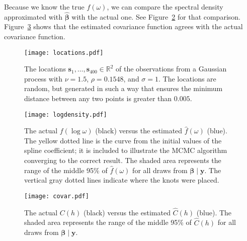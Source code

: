 Because we know the true $f(\omega)$, we can compare the spectral density approximated with $\widehat{\bm{\beta}}$ with the actual one. See Figure~\ref{fig:result} for that comparison. Figure~\ref{fig:result-covar} shows that the estimated covariance function agrees with the actual covariance function.


\begin{figure}[!htb]
	\centering
	\texttt{[image: locations.pdf]}
	\caption{\small The locations $\bm{s}_1, \dots, \bm{s}_{400} \in \mathbb{R}^2$ of the observations from a Gaussian process with $\nu = 1.5$, $\rho = 0.1548$, and $\sigma = 1$. The locations are random, but generated in such a way that ensures the minimum distance between any two points is greater than $0.005$.}
	\label{fig:locations}
\end{figure}

\begin{figure}[!htb]
	\centering
	\texttt{[image: logdensity.pdf]}
	\caption{\small The actual $f(\log \omega)$ (black) versus the estimated $\hat{f}(\omega)$ (blue). The yellow dotted line is the curve from the initial values of the spline coefficient; it is included to illustrate the MCMC algorithm converging to the correct result. The shaded area represents the range of the middle 95\% of $\hat{f}(\omega)$ for all draws from $\bm{\beta} \;|\; \bm{y}$. The vertical gray dotted lines indicate where the knots were placed.}
	\label{fig:result}
\end{figure}

\begin{figure}[!htb]
	\centering
	\texttt{[image: covar.pdf]}
	\caption{\small The actual $C(h)$ (black) versus the estimated $\widehat{C}(h)$ (blue). The shaded area represents the range of the middle 95\% of $\widehat{C}(h)$ for all draws from $\bm{\beta} \;|\; \bm{y}$.}
	\label{fig:result-covar}
\end{figure}

